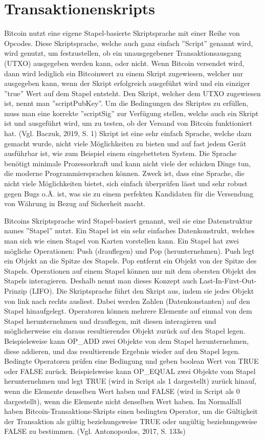 \section{Transaktionenskripts}
Bitcoin nutzt eine eigene Stapel-basierte Skriptsprache mit einer Reihe von Opcodes. Diese Skriptsprache, welche auch ganz 
einfach ''Script'' genannt wird, wird genutzt, um festzustellen, ob ein unausgegebener Transaktionsausgang (UTXO) ausgegeben 
werden kann, oder nicht. Wenn Bitcoin versendet wird,
dann wird lediglich ein Bitcoinwert zu einem Skript zugewiesen, welcher nur ausgegeben kann, wenn der Skript erfolgreich
ausgeführt wird und ein einziger ''true'' Wert auf dem Stapel entsteht. Den Skript, welcher dem UTXO zugewiesen ist, nennt man
''scriptPubKey''. Um die Bedingungen des Skriptes zu erfüllen, muss man eine korrekte ''scriptSig'' zur Verfügung stellen,
welche auch ein Skript ist und ausgeführt wird, um zu testen, ob der Versand von Bitcoin funktioniert hat. (Vgl. Baczuk, 2019,
S. 1) Skript ist eine sehr einfach Sprache, welche dazu gemacht wurde, nicht viele Möglichkeiten zu bieten und auf fast jedem
Gerät ausführbar ist, wie zum Beispiel einem eingebetteten System. Die Sprache benötigt minimale Prozessorkraft und kann nicht 
viele der schicken Dinge tun, die moderne Programmiersprachen können. Zweck ist, dass eine Sprache, die nicht viele Möglichkeiten
bietet, sich einfach überprüfen lässt und sehr robust gegen Bugs o.Ä. ist, was sie zu einem perfekten Kandidaten für die 
Versendung von Währung in Bezug auf Sicherheit macht.

Bitcoins Skriptsprache wird Stapel-basiert genannt, weil sie eine Datenstruktur names ''Stapel'' nutzt. Ein Stapel ist ein sehr
einfaches Datenkonstrukt, welches man sich wie einen Stapel von Karten vorstellen kann. Ein Stapel hat zwei mögliche Operationen:
Push (drauflegen) und Pop (herunternehmen). Push legt ein Objekt an die Spitze des Stapels. Pop entfernt ein Objekt von der
Spitze des Stapels. Operationen auf einem Stapel können nur mit dem obersten Objekt des Stapels interagieren. Deshalb nennt man
dieses Konzept auch Last-In-First-Out-Prinzip (LIFO). Die Skriptsprache führt den Skript aus, indem sie jedes Objekt von link
nach rechts ausliest. Dabei werden Zahlen (Datenkonstanten) auf den Stapel hinaufgelegt. Operatoren können mehrere Elemente auf
einmal von dem Stapel herunternehmen und drauflegen, mit diesen interagieren und möglicherweise ein daraus resultierendes Objekt
zurück auf den Stapel legen. Beispielsweise kann OP\_ADD zwei Objekte von dem Stapel herunternehmen, diese addieren, und das
resultierende Ergebnis wieder auf den Stapel legen.
Bedingte Operatoren prüfen eine Bedingung und geben boolean Wert von TRUE oder FALSE zurück. Beispielsweise kann OP\_EQUAL zwei
Objekte vom Stapel herunternehmen und legt TRUE (wird in Script als 1 dargestellt) zurück hinauf, wenn die Elemente denselben
Wert haben und FALSE (wird in Script als 0 dargestellt), wenn die Elemente nicht denselben Wert haben. Im Normalfall haben
Bitcoin-Transaktions-Skripts einen bedingten Operator, um die Gültigkeit der Transaktion als gültig beziehungsweise TRUE oder
ungültig beziehungsweise FALSE zu bestimmen.  (Vgl. Antonopoulos, 2017, S. 133s)

